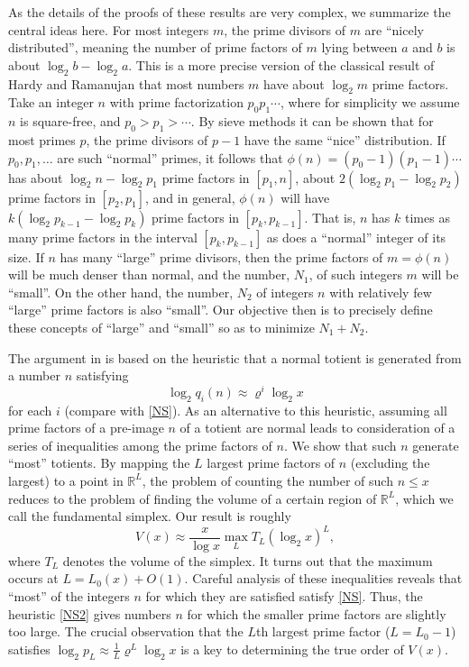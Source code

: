 \documentclass[11pt]{amsart}
\theoremstyle{remark}
\theoremstyle{plain}
\numberwithin{equation}{section}
\newcommand{\RR}{{\mathbb R}}
\newcommand{\be}{\begin{equation}}
\newcommand{\ee}{\end{equation}}
\renewcommand{\(}{\left(}
\renewcommand{\)}{\right)}
\renewcommand{\le}{\leqslant}
\renewcommand{\rho}{\varrho}
\begin{document}
As the details of the proofs of these results are very complex,
 we summarize the central ideas here.
For most integers $m$, the
prime divisors of $m$ are ``nicely distributed'', meaning the
number of prime factors of $m$ lying between $a$ and $b$ is about
$\log_2 b - \log_2 a$.  This is a more precise version of the classical result 
of Hardy and Ramanujan \cite{HRa} that most numbers $m$ have
about $\log_2 m$ prime factors.
Take an integer $n$ with prime factorization
$p_0 p_1 \cdots $, where for simplicity we assume $n$ is square-free,
and $p_0>p_1> \cdots$.  By sieve methods it can be shown that for most
primes $p$, the prime divisors of $p-1$ have the same ``nice'' distribution.
If $p_0, p_1, \ldots$ are such ``normal'' primes, it follows
that $\phi(n) = (p_0-1)(p_1-1)\cdots$ has about $\log_2 n - \log_2 p_1$
prime factors
in $[p_1,n]$, about $2(\log_2 p_1 - \log_2 p_2)$ prime factors in
$[p_2,p_1]$, and in general, $\phi(n)$ will have $k(\log_2 p_{k-1} -
\log_2 p_k)$ prime factors in $[p_k,p_{k-1}]$.  That is, $n$ has $k$
times as many prime factors in the interval $[p_k,p_{k-1}]$ as does a
``normal'' integer of its size.
If $n$ has many ``large'' prime divisors, then the prime
factors of $m=\phi(n)$ will be much denser than normal, and the number,
$N_1$, of such
integers $m$ will be ``small''.  On the other hand, the number, $N_2$ of
integers
$n$ with relatively few ``large'' prime factors is also ``small''. 
 Our objective
then is to precisely define these concepts of ``large'' and ``small'' so as
to minimize $N_1+N_2$.

The argument in \cite{MP} is based on the heuristic that a normal totient is
generated from a number $n$ satisfying 
\be\label{NS2}
\log_2 q_i(n) \approx\rho^i \log_2 x 
\ee
for each $i$ (compare with \eqref{NS}).
As an alternative to this heuristic, assuming all prime
factors of a pre-image $n$ of a totient are normal leads to
consideration of a series
of inequalities among the prime factors of $n$.  We show that such
$n$ generate
``most'' totients.  By mapping the $L$ largest prime factors of $n$
(excluding the largest) to a
point in $\RR^L$, the problem of counting the number of such $n\le x$
reduces to the problem of finding the volume of a certain
region of $\RR^L$, which we call the fundamental simplex. 
Our result is roughly
$$
V(x) \approx \frac{x}{\log x} \max_{L} T_L (\log_2 x)^L,
$$
where $T_L$ denotes the volume of the simplex.  It turns out that the maximum
occurs at $L=L_0(x) + O(1)$.
Careful analysis of these inequalities reveals that
``most'' of the integers $n$ for which they are satisfied
satisfy \eqref{NS}.  Thus, the heuristic \eqref{NS2} gives numbers
$n$ for which the smaller prime factors are slightly too large.
The crucial observation that the $L$th largest prime factor
($L=L_0-1$) satisfies
$\log_2 p_L \approx \frac{1}{L}\rho^L \log_2 x$
is a key to determining the true order of $V(x)$.
\end{document}
